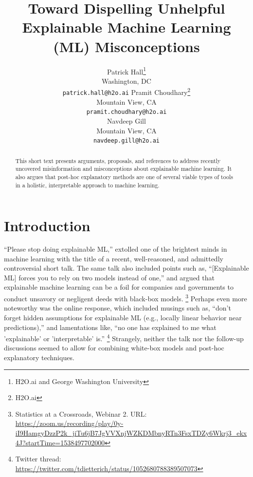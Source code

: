 \documentclass{article}
\title{Toward Dispelling Unhelpful Explainable Machine Learning (ML) Misconceptions}
\author{
  Patrick Hall\thanks{H2O.ai and George Washington University}\\
  Washington, DC\\
  \texttt{patrick.hall@h2o.ai}
  \And
  Pramit Choudhary\thanks{H2O.ai}\\
  Mountain View, CA\\
  \texttt{pramit.choudhary@h2o.ai}\\
  \And
  Navdeep Gill\samethanks\\
  Mountain View, CA\\
  \texttt{navdeep.gill@h2o.ai}
}
\begin{document}
\maketitle

\begin{abstract}

This short text presents arguments, proposals, and references to address recently uncovered misinformation and misconceptions about explainable machine learning. It also argues that post-hoc explanatory methods are one of several viable types of tools in a holistic, interpretable approach to machine learning.

\end{abstract}

\section{Introduction}

``Please stop doing explainable ML,'' extolled one of the brightest minds in machine learning with the title of a recent, well-reasoned, and admittedly controversial short talk. The same talk also included points such as, ``[Explainable ML] forces you to rely on two models instead of one,'' and argued that explainable machine learning can be a foil for companies and governments to conduct unsavory or negligent deeds with black-box models. \footnote{Statistics at a Crossroads, Webinar 2. URL: \url{https://zoom.us/recording/play/0y-iI9HamgyDzzP2k_jiTu6jB7JgVVXnjWZKDMbnyRTn3FsxTDZy6Wkrj3_ekx4J?startTime=1538497702000}} Perhaps even more noteworthy was the online response, which included musings such as, ``don’t forget hidden assumptions for explainable ML (e.g., locally linear behavior near predictions),'' and lamentations like, ``no one has explained to me what 'explainable' or 'interpretable' is.'' \footnote{Twitter thread: \url{https://twitter.com/tdietterich/status/1052680788389507073}} Strangely, neither the talk nor the follow-up discussions seemed to allow for combining white-box models and post-hoc explanatory techniques. 
\end{document}
